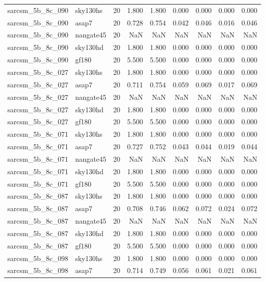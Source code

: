\begin{tabular}{llrrrrrrr}
sarcsm\_5b\_8c\_090 & sky130hs & 20 & 1.800 & 1.800 & 0.000 & 0.000 & 0.000 & 0.000 \\
sarcsm\_5b\_8c\_090 & asap7 & 20 & 0.728 & 0.754 & 0.042 & 0.046 & 0.016 & 0.046 \\
sarcsm\_5b\_8c\_090 & nangate45 & 20 & NaN & NaN & NaN & NaN & NaN & NaN \\
sarcsm\_5b\_8c\_090 & sky130hd & 20 & 1.800 & 1.800 & 0.000 & 0.000 & 0.000 & 0.000 \\
sarcsm\_5b\_8c\_090 & gf180 & 20 & 5.500 & 5.500 & 0.000 & 0.000 & 0.000 & 0.000 \\
sarcsm\_5b\_8c\_027 & sky130hs & 20 & 1.800 & 1.800 & 0.000 & 0.000 & 0.000 & 0.000 \\
sarcsm\_5b\_8c\_027 & asap7 & 20 & 0.711 & 0.754 & 0.059 & 0.069 & 0.017 & 0.069 \\
sarcsm\_5b\_8c\_027 & nangate45 & 20 & NaN & NaN & NaN & NaN & NaN & NaN \\
sarcsm\_5b\_8c\_027 & sky130hd & 20 & 1.800 & 1.800 & 0.000 & 0.000 & 0.000 & 0.000 \\
sarcsm\_5b\_8c\_027 & gf180 & 20 & 5.500 & 5.500 & 0.000 & 0.000 & 0.000 & 0.000 \\
sarcsm\_5b\_8c\_071 & sky130hs & 20 & 1.800 & 1.800 & 0.000 & 0.000 & 0.000 & 0.000 \\
sarcsm\_5b\_8c\_071 & asap7 & 20 & 0.727 & 0.752 & 0.043 & 0.044 & 0.019 & 0.044 \\
sarcsm\_5b\_8c\_071 & nangate45 & 20 & NaN & NaN & NaN & NaN & NaN & NaN \\
sarcsm\_5b\_8c\_071 & sky130hd & 20 & 1.800 & 1.800 & 0.000 & 0.000 & 0.000 & 0.000 \\
sarcsm\_5b\_8c\_071 & gf180 & 20 & 5.500 & 5.500 & 0.000 & 0.000 & 0.000 & 0.000 \\
sarcsm\_5b\_8c\_087 & sky130hs & 20 & 1.800 & 1.800 & 0.000 & 0.000 & 0.000 & 0.000 \\
sarcsm\_5b\_8c\_087 & asap7 & 20 & 0.708 & 0.746 & 0.062 & 0.072 & 0.024 & 0.072 \\
sarcsm\_5b\_8c\_087 & nangate45 & 20 & NaN & NaN & NaN & NaN & NaN & NaN \\
sarcsm\_5b\_8c\_087 & sky130hd & 20 & 1.800 & 1.800 & 0.000 & 0.000 & 0.000 & 0.000 \\
sarcsm\_5b\_8c\_087 & gf180 & 20 & 5.500 & 5.500 & 0.000 & 0.000 & 0.000 & 0.000 \\
sarcsm\_5b\_8c\_098 & sky130hs & 20 & 1.800 & 1.800 & 0.000 & 0.000 & 0.000 & 0.000 \\
sarcsm\_5b\_8c\_098 & asap7 & 20 & 0.714 & 0.749 & 0.056 & 0.061 & 0.021 & 0.061 \\

\end{tabular}
